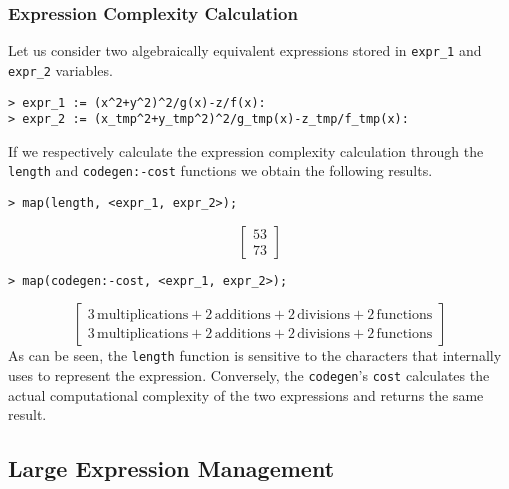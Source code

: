 \subsubsection{Expression Complexity Calculation}

Let us consider two algebraically equivalent expressions stored in \texttt{expr\_1} and \texttt{expr\_2} variables.
%
\begin{verbatim}
> expr_1 := (x^2+y^2)^2/g(x)-z/f(x):
> expr_2 := (x_tmp^2+y_tmp^2)^2/g_tmp(x)-z_tmp/f_tmp(x):
\end{verbatim}
%
If we respectively calculate the expression complexity calculation through the \texttt{length} and \texttt{codegen:-cost} functions we obtain the following results.
%
\begin{verbatim}
> map(length, <expr_1, expr_2>);
\end{verbatim}
\begin{equation*}
    \begin{bmatrix}
        53 \\
        73
    \end{bmatrix}
\end{equation*}
\begin{verbatim}
> map(codegen:-cost, <expr_1, expr_2>);
\end{verbatim}
\begin{equation*}
  \begin{bmatrix}
        3\,\mathrm{multiplications} + 2\,\mathrm{additions} + 2\,\mathrm{divisions} + 2\,\mathrm{functions} \\
        3\,\mathrm{multiplications} + 2\,\mathrm{additions} + 2\,\mathrm{divisions} + 2\,\mathrm{functions}
    \end{bmatrix}
\end{equation*}
%
As can be seen, the \texttt{length} function is sensitive to the characters that \Maple{} internally uses to represent the expression. Conversely, the \texttt{codegen}'s \texttt{cost} calculates the actual computational complexity of the two expressions and returns the same result.

\subsection{Large Expression Management}

